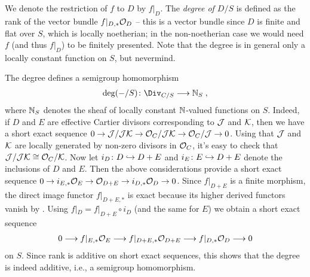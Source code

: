 \documentclass[a4paper,parskip=half,numbers=enddot, DIV=12]{scrreprt}
\begin{document}
\begin{rem}
	We denote the restriction of $f$ to $D$ by $f|_D$. The \emph{degree of $D/S$} is defined as the rank of the vector bundle $f|_{D,*}\mathcal{O}_D$ -- this is a vector bundle since $D$ is finite and flat over $S$, which is locally noetherian; in the non-noetherian case we would need $f$ (and thus $f|_D$) to be finitely presented. Note that the degree is in general only a locally constant function on $S$, but nevermind.
		
	The degree defines a semigroup homomorphism
	\begin{align*}
		\deg(-/S)\colon \Div_{C/S}\morphism \IN_S\;,
	\end{align*}
	where $\mathbb{N}_S$ denotes the sheaf of locally constant $\mathbb{N}$-valued functions on $S$. Indeed, if $D$ and $E$ are effective Cartier divisors corresponding to $\mathcal{J}$ and $\mathcal{K}$, then we have a short exact sequence $0\morphism \Jj/\Jj\Kk\morphism\Oo_C/\Jj\Kk\morphism\Oo_C/\Jj\morphism 0$. Using that $\mathcal{J}$ and $\mathcal{K}$ are locally generated by non-zero divisors in $\mathcal{O}_C$, it's easy to check that $\mathcal{J}/\mathcal{J}\mathcal{K}\cong \mathcal{O}_C/\mathcal{K}$. Now let $i_D\colon D\monomorphism D+E$ and $i_E\colon E\monomorphism D+E$ denote the inclusions of $D$ and $E$. Then the above considerations provide a short exact sequence $0\morphism i_{E,*}\Oo_E\morphism\Oo_{D+E}\morphism i_{D,*}\Oo_D\morphism 0$. Since $f|_{D+E}$ is  a finite morphism, the direct image functor $f|_{D+E,*}$ is exact because its higher derived functors vanish by \cite[Proposition~1.6.1]{alggeo2}. Using $f|_D=f|_{D+E}\circ i_D$ (and the same for $E$) we obtain a short exact sequence
	\begin{align*}
		0\morphism f|_{E,*}\Oo_E\morphism f|_{D+E,*}\Oo_{D+E}\morphism f|_{D,*}\Oo_D\morphism 0
	\end{align*}
	on $S$. Since rank is additive on short exact sequences, this shows that the degree is indeed additive, i.e., a semigroup homomorphism.
\end{rem}
\end{document}
